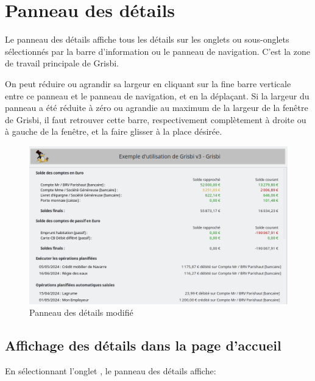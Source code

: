 \section{Panneau des détails\label{home-details}}

Le panneau des détails affiche tous les détails sur les onglets ou sous-onglets sélectionnés par la barre d'information ou le panneau de navigation. C'est la zone de travail principale de Grisbi.

On peut réduire ou agrandir sa largeur en cliquant sur la fine barre verticale entre ce panneau et le panneau de navigation, et en la déplaçant. Si la largeur du panneau a été réduite à zéro ou agrandie au maximum de la largeur de la fenêtre de Grisbi, il faut retrouver cette barre, respectivement complètement à droite ou à gauche de la fenêtre, et la faire glisser à la place désirée. 

\begin{figure}[htbp]			%
	\begin{center}
		\includegraphics[width=1\textwidth]{image/screenshot/home_details.png}
	\end{center}
	\caption{Panneau des détails modifié}		%
	\label{home_details}
\end{figure}

\subsection{Affichage des détails dans la page d'accueil\label{home-details-homepage}}

En sélectionnant l'onglet , le panneau des détails affiche:

